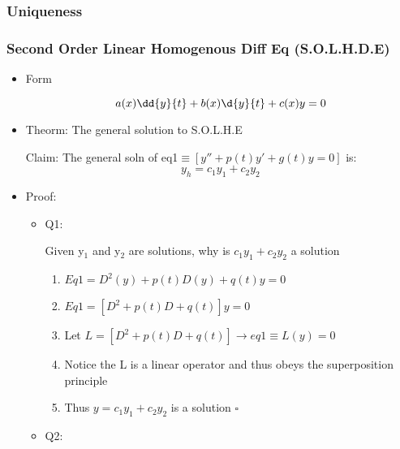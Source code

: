 \documentclass[11pt]{article}
\begin{document}
\subsubsection{Uniqueness}
\label{sec-9.2.3}

\subsubsection{Second Order Linear Homogenous Diff Eq (S.O.L.H.D.E)}
\label{sec-9.2.4}

\begin{itemize}

\item Form\\
\label{sec-9.2.4.1}

     \begin{equation}
     a(x)\dd{y}{t} + b(x)\d{y}{t} + c(x)y=0
     \end{equation}

\item Theorm: The general solution to S.O.L.H.E\\
\label{sec-9.2.4.2}

     Claim: The general soln of eq1$\equiv [y''+p(t)y'+g(t)y=0]$ is:
     \begin{equation}
     y_h=c_1y_1+c_2 y_2
     \end{equation}

\item Proof:\\
\label{sec-9.2.4.3}

\begin{itemize}

\item Q1:\\
\label{sec-9.2.4.3.1}

      Given y$_1$ and y$_2$ are solutions, why is $c_1y_1+c_2y_2$ a solution
\begin{enumerate}
\item $Eq1=D^2(y)+p(t)D(y)+q(t)y=0$
\item $Eq1=[D^2+p(t)D+q(t)]y=0$
\item Let $L=[D^2+p(t)D+q(t)]\rightarrow eq1\equiv L(y)=0$
\item Notice the L is a linear operator and thus obeys the
            superposition principle
\item Thus $y = c_1 y_1 +c_2 y_2$ is a solution $\square$
\end{enumerate}

\item Q2:\\
\label{sec-9.2.4.3.2}


\end{itemize}
\end{itemize}
\end{document}

